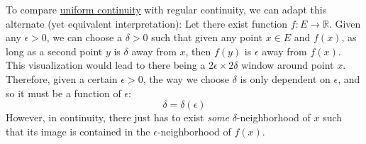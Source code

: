   To compare \hyperref[def:uniform-continuity]{uniform continuity} with regular continuity, we can adapt this alternate (yet equivalent interpretation): Let there exist function $f: E \to \mathbb{R}$. Given any $\epsilon>0$, we can choose a $\delta>0$ such that given any point $x \in E$ and $f(x)$, as long as a second point $y$ is $\delta$ away from $x$, then $f(y)$ is $\epsilon$ away from $f(x)$. This visualization would lead to there being a $2\epsilon \times 2\delta$ window around point $x$. Therefore, given a certain $\epsilon > 0$, the way we choose $\delta$ is only dependent on $\epsilon$, and so it must be a function of $\epsilon$: 
  \begin{equation}
    \delta = \delta(\epsilon)
  \end{equation}
  However, in continuity, there just has to exist \textit{some} $\delta$-neighborhood of $x$ such that its image is contained in the $\epsilon$-neighborhood of $f(x)$. 

